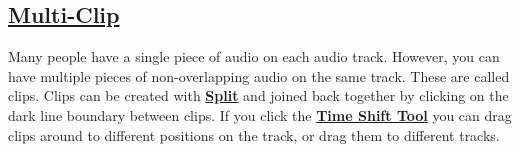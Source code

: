 \documentclass[]{book}
\begin{document}
\begin{multicols}{2}
\subsection{
\hyperref[audacity_tracks_and_clips_]{Multi-Clip}
}


Many people have a single piece of audio on each audio track.  However, you can have multiple pieces of non-overlapping audio on the same track.  These are called clips.  Clips can be created with \textbf{
\hyperref[audacity_tracks_and_clips__split]{Split}
} and joined back together by clicking on the dark line boundary between clips. If you click the \textbf{
\hyperref[tools_toolbar__timeshift]{Time Shift Tool}
} you can drag clips around to different positions on the track, or drag them to different tracks.
																																								\end{multicols}		

\iffalse


\fi
\end{document}
